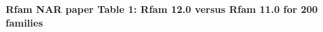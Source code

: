 \documentclass[landscape]{slides}
\begin{document}
\begin{slide}
\begin{center}
\small
\textbf{Rfam NAR paper Table 1: Rfam 12.0 versus Rfam 11.0 for 200 families}
\end{center}


\vfill
\end{slide}
\end{document}
